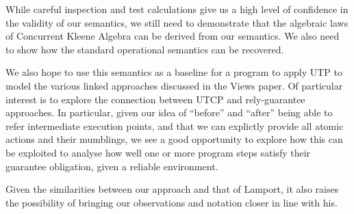 
While careful inspection and test calculations
give us a high level of confidence in the validity of our semantics,
we still need to demonstrate that the algebraic laws
of Concurrent Kleene Algebra\cite{Hoare2009}
can be derived from our semantics.
We also need to show how the standard operational semantics can be recovered.

We also hope to use this semantics as a baseline for a program to apply UTP
to model the various linked approaches discussed in the Views paper\cite{conf/popl/Dinsdale-YoungBGPY13}.
Of particular interest is to explore the connection
between UTCP and rely-guarantee\cite{PhD:CBJones:1981} approaches.
In particular,
given our idea of ``before'' and ``after'' being able to refer intermediate
execution points, and that we can explictly provide all atomic actions and their mumblings,
we see a good opportunity to explore how this can be exploited
to analyse how well one or more program steps satisfy their
guarantee obligation, given a reliable environment.

Given the similarities between our approach and that of Lamport,
it also raises the possibility of bringing our observations
and notation closer in line with his.
